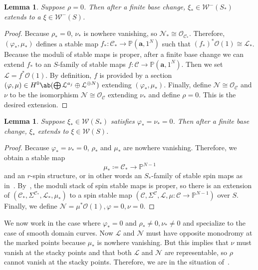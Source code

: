 \documentclass{amsart}
\newtheorem{lem}[thm]{Lemma}
\theoremstyle{definition}
\theoremstyle{remark}
\theoremstyle{plain}
\theoremstyle{definition}
\theoremstyle{remark}
\renewcommand{\P}{\mathbb{P}}
\newcommand{\ba}{\mathbf{a}}
\newcommand{\mc}[1]{\mathcal{#1}}
\newcommand{\1}{\mathbf{1}}
\newcommand{\2}{\mathbf{2}}
\newcommand{\3}{\mathbf{3}}
\begin{document}
\begin{lem}
    Suppose $\rho = 0$. Then after a finite base change, $\xi_* \in \mc{W}^{-}(S_*)$ extends to a $\xi \in \mc{W}^-(S)$. 
\end{lem}

\begin{proof}
    Because $\rho_* = 0$, $\nu_*$ is nowhere vanishing, so $\mc{N}_* \cong \mc{O}_{\mc{C}_*}$. Therefore, $(\varphi_*, \mu_*)$ defines a stable map $f_* \colon \mc{C}_* \to \P(\ba,1^N)$ such that $(f_*)^* \mc{O}(1) \cong \mc{L}_*$. Because the moduli of stable maps is proper, after a finite base change we can extend $f_*$ to an $S$-family of stable maps $f \colon \mc{C} \to \P(\ba,1^N)$. Then we set $\mc{L} = f^* \mc{O}(1)$. By definition, $f$ is provided by a section $(\varphi,\mu) \in H^0\ab(\bigoplus \mc{L}^{a_j} \oplus \mc{L}^{\oplus N})$ extending $(\varphi_*,\mu_*)$. Finally, define $\mc{N} \cong \mc{O}_{\mc{C}}$ and $\nu$ to be the isomorphism $\mc{N} \cong \mc{O}_{\mc{C}}$ extending $\nu_*$ and define $\rho = 0$. This is the desired extension.
\end{proof}

\begin{lem}
    Suppose $\xi_* \in \mc{W}(S_*)$ satisfies $\varphi_* = \nu_* = 0$. Then after a finite base change, $\xi_*$ extends to $\xi \in \mc{W}(S)$.
\end{lem}

\begin{proof}
    Because $\varphi_* = \nu_* = 0$, $\rho_*$ and $\mu_*$ are nowhere vanishing. Therefore, we obtain a stable map
    \[ \mu_* \coloneqq \mc{C}_* \to \P^{N-1} \]
    and an $r$-spin structure, or in other words an $S_*$-family of stable spin maps as in~\cite{spingw}. By~\cite[Proposition 2.23]{spingw}, the moduli stack of spin stable maps is proper, so there is an extension of $(\mc{C}_*, \Sigma^{\mc{C}_*},\mc{L}_*,\mu_*)$ to a spin stable map $(\mc{C}, \Sigma^{\mc{C}},\mc{L},\mu \colon \mc{C} \to \P^{N-1})$ over $S$. Finally, we define $\mc{N} = \mu^* \mc{O}(1), \varphi = 0, \nu = 0$.
\end{proof}

We now work in the case where $\varphi_* = 0$ and $\rho_* \neq 0, \nu_* \neq 0$ and specialize to the case of smooth domain curves. Now $\mc{L}$ and $\mc{N}$ must have opposite monodromy at the marked points because $\mu_*$ is nowhere vanishing. But this implies that $\nu$ must vanish at the stacky points and that both $\mc{L}$ and $\mc{N}$ are representable, so $\rho$ cannot vanish at the stacky points. Therefore, we are in the situation of~\cite[\S 3.2]{nmsp}.
\end{document}
